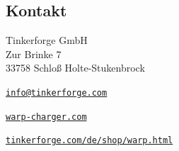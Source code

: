 \documentclass[a4paper,10pt]{article}
\begin{document}
\begin{multicols*}{2}
    \newpage

    \section{Kontakt}
    Tinkerforge GmbH\\ Zur Brinke 7\\ 33758 Schloß Holte-Stukenbrock
    \begin{description}[leftmargin=!,labelwidth=\widthof{\textbf{Website}}]
        \item[E-Mail] \href{mailto:info@tinkerforge.com}{\texttt{info@tinkerforge.com}}
        \item[Website] \href{https://warp-charger.com}{\texttt{warp-charger.com}}
        \item[Telefon] 
        \item[Shop] \href{https://tinkerforge.com/de/shop/warp.html}{\texttt{tinkerforge.com/de/shop/warp.html}}
    \end{description}


\end{multicols*}
\end{document}
